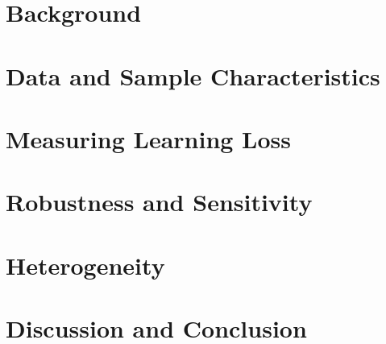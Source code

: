 \documentclass[12pt]{article}
\begin{document}
\section{Background}
\label{sec:background}


\section{Data and Sample Characteristics}
\label{sec:data}


\section{Measuring Learning Loss}
\label{sec:results}


\section{Robustness and Sensitivity}
\label{sec:robustness}


\section{Heterogeneity}
\label{sec:heterogeneity}


\section{Discussion and Conclusion}
\label{sec:conclusion}




\end{document}
